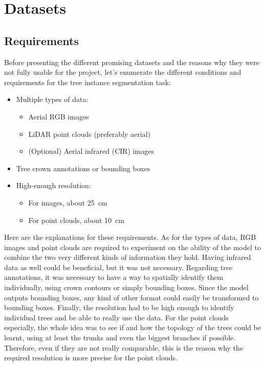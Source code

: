 \documentclass[
]{report}
\providecommand{\tightlist}{%
  \setlength{\itemsep}{0pt}\setlength{\parskip}{0pt}}\usepackage{longtable,booktabs,array}
\begin{document}
\section{Datasets}\label{datasets}

\subsection{Requirements}\label{sec-sota-datasets-requirements}

Before presenting the different promising datasets and the reasons why
they were not fully usable for the project, let's enumerate the
different conditions and requirements for the tree instance segmentation
task:

\begin{itemize}
\tightlist
\item
  Multiple types of data:

  \begin{itemize}
  \tightlist
  \item
    Aerial RGB images
  \item
    LiDAR point clouds (preferably aerial)
  \item
    (Optional) Aerial infrared (CIR) images
  \end{itemize}
\item
  Tree crown annotations or bounding boxes
\item
  High-enough resolution:

  \begin{itemize}
  \tightlist
  \item
    For images, about 25~cm
  \item
    For point clouds, about 10~cm
  \end{itemize}
\end{itemize}

Here are the explanations for these requirements. As for the types of
data, RGB images and point clouds are required to experiment on the
ability of the model to combine the two very different kinds of
information they hold. Having infrared data as well could be beneficial,
but it was not necessary. Regarding tree annotations, it was necessary
to have a way to spatially identify them individually, using crown
contours or simply bounding boxes. Since the model outputs bounding
boxes, any kind of other format could easily be transformed to bounding
boxes. Finally, the resolution had to be high enough to identify
individual trees and be able to really use the data. For the point
clouds especially, the whole idea was to see if and how the topology of
the trees could be learnt, using at least the trunks and even the
biggest branches if possible. Therefore, even if they are not really
comparable, this is the reason why the required resolution is more
precise for the point clouds.
\end{document}
